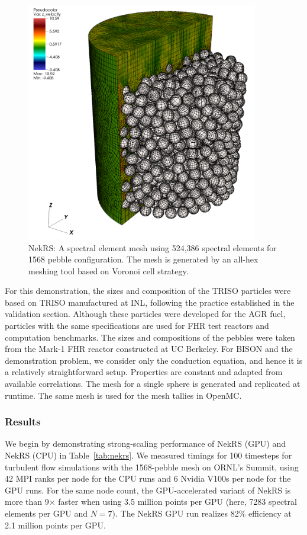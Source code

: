 \begin{figure}[!h]
\centering
\includegraphics[clip=true,width=0.9\textwidth]{Figures/ndemo_r1}
\caption{NekRS: A spectral element mesh using 524,386 spectral elements for 1568 pebble configuration.
         The mesh is generated by an all-hex meshing tool based on Voronoi cell strategy.}
\label{f:ndemo1}
\end{figure}

For this demonstration, the sizes and composition of the TRISO particles were
based on TRISO manufactured at INL, following the practice established in the
validation section. Although these particles were developed for the AGR fuel,
particles with the same specifications are used for FHR test reactors and
computation benchmarks. The sizes and compositions of the pebbles were taken
from the Mark-1 FHR reactor constructed at UC Berkeley. For BISON and the
demonstration problem, we consider only the conduction equation, and hence  it
is a relatively straightforward setup. Properties are constant and adapted from
available correlations. The mesh for a single sphere is generated and
replicated at runtime. The same mesh is used for the mesh tallies in OpenMC.

\subsubsection{Results}
We begin by demonstrating strong-scaling performance of NekRS (GPU) and NekRS
(CPU) in Table~\ref{tab:nekrs}.  We measured timings for 100 timesteps for
turbulent flow simulations with the 1568-pebble mesh on ORNL's Summit, using 42
MPI ranks per node for the CPU runs and 6 Nvidia V100s per node for the GPU
runs.  For the same node count, the GPU-accelerated variant of NekRS is more
than 9$\times$ faster when using 3.5 million points per GPU (here, 7283
spectral elements per GPU and $N=7$).  The NekRS GPU run realizes 82\%
efficiency at 2.1 million points per GPU.


